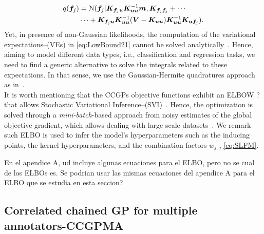 \documentclass[journal]{IEEEtran}
\providecommand{\ve}[1]{{\bm{#1}}}%
\providecommand{\mat}[1]{{\bm{#1}}} %
\providecommand{\ve}[1]{{\mathbf{#1}}}
\providecommand{\mat}[1]{{\mathbf{#1}}}
\newcommand{\gauss}{\mathcal{N}} %
\newcommand{\comment}[2]{{\color{blue}#1} {\color{red}#2}}
\begin{document}
\begin{align}
\notag q(\ve{f}_j) &=\gauss(\ve{f}_j|\mat{K}_{\ve{f}_j\ve{u}}\mat{K}_{\ve{u}\ve{u}}^{-1}\ve{m}, \mat{K}_{\ve{f}_j\ve{f}_j}+\cdots\\
& \cdots + \mat{K}_{\ve{f}_j\ve{u}}\mat{K}_{\ve{u}\ve{u}}^{-1}(\mat{V}-\mat{K}_{\ve{u}\ve{u}})\mat{K}_{\ve{u}\ve{u}}^{-1}\mat{K}_{\ve{u}\ve{f}_j}).
\end{align}
Yet, in presence of non-Gaussian likelihoods, the computation of the variational expectations--(VEs) in \cref{eq:LowBound21} cannot be solved analytically~\cite{saul2016chained,moreno2018heterogeneous}. Hence, aiming to model different data types, i.e., classification and regression tasks, we need to find a generic alternative to solve the integrals related to these expectations. In that sense, we use the Gaussian-Hermite quadratures approach as in~\cite{hensman2015scalable,saul2016chained}.\\
It is worth mentioning that the CCGPs objective functions exhibit an
ELBO\comment{W}{?} that allows Stochastic Variational
Inference--(SVI)~\cite{blei2017variational}. Hence, the optimization
is solved through a \textit{mini-batch}-based approach from noisy
estimates of the global objective gradient, which allows dealing with
large scale
datasets~\cite{hensman2015scalable,saul2016chained,moreno2018heterogeneous}. We
remark such ELBO is used to infer the model's hyperparameters such as
the inducing points, the kernel hyperparameters, and the combination
factors $w_{j,q}$ \cref{eq:SLFM}.

\comment{}{En el apendice A, ud incluye algunas ecuaciones para el
  ELBO, pero no se cual de los ELBOs es. Se podrian usar las mismas
  ecuaciones del apendice A para el ELBO que se estudia en esta seccion?}

\subsection{Correlated chained GP for multiple annotators-CCGPMA}
\end{document}
